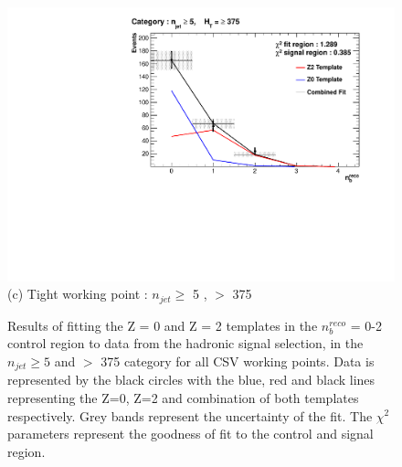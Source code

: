 \begin{figure}[ht]
\begin{minipage}[b]{0.51\linewidth}
\centering
\includegraphics[width = 1.0\linewidth]{plots/TemplatesSignal/Final_Fit_To_Data_Normal_Tight_HTBin_Template_375_jet_mult_5.pdf}
\centering (c) Tight working point :  $n_{jet} \geq$ 5 , \theht $>$ 375 
\end{minipage}
\caption[Results of fitting the Z = 0 and Z = 2 templates in the $n_{b}^{reco}$ = 0-2 control region to data from the hadronic signal selection, in the $n_{jet} \geq 5$ and \theht $>$ 375 category for all \ac{CSV} working points.]{Results of fitting the Z = 0 and Z = 2 templates in the $n_{b}^{reco}$ = 0-2 control region to data from the hadronic signal selection, in the $n_{jet} \geq 5$ and \theht $>$ 375 category for all \ac{CSV} working points. Data is represented by the black circles with the blue, red and black lines representing the Z=0, Z=2 and combination of both templates respectively. Grey bands represent the uncertainty of the fit. The $\chi^{2}$ parameters represent the goodness of fit to the control and signal region.}
\label{fig:template_data_signal_njet5}
\end{figure}
\FloatBarrier

